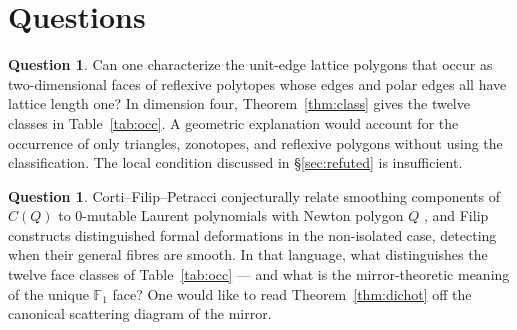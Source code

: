 \documentclass[11pt]{amsart}
\theoremstyle{definition}
\newtheorem{question}[theorem]{Question}
\theoremstyle{remark}
\newcommand{\FF}{\mathbb{F}}
\begin{document}
\section{Questions}\label{sec:questions}

\begin{question}\label{q:why}
Can one characterize the unit-edge lattice polygons that occur as
two-dimensional faces of reflexive polytopes whose edges and polar edges
all have lattice length one?  In dimension four,
Theorem~\ref{thm:class} gives the twelve classes in
Table~\ref{tab:occ}.  A geometric
explanation would account for the occurrence of only triangles,
zonotopes, and reflexive polygons without using the classification.
The local condition discussed in \S\ref{sec:refuted} is insufficient.
\end{question}

\begin{question}\label{q:mutable}
Corti--Filip--Petracci conjecturally relate smoothing components of $C(Q)$ to $0$-mutable
Laurent polynomials with Newton polygon $Q$ \cite{CFP}, and Filip
\cite{Filip25} constructs distinguished formal deformations in the
non-isolated case, detecting when their general fibres are smooth.  In that language, what
distinguishes the twelve face classes of Table~\ref{tab:occ} --- and what is
the mirror-theoretic meaning of the unique $\FF_1$ face?  One would like to
read Theorem~\ref{thm:dichot} off the canonical scattering diagram of the
mirror.
\end{question}
\end{document}
